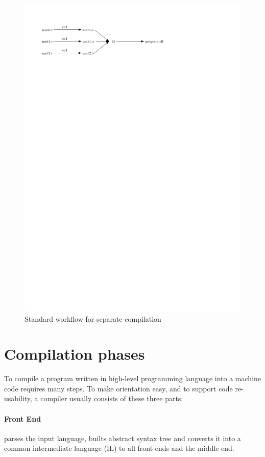 \begin{figure}[h!]
\label{figure-non-lto-workflow}
\centering
\includegraphics{./img/non-lto-workflow.pdf}
\caption{Standard workflow for separate compilation}
\end{figure}


\section{Compilation phases}

To compile a program written in high-level programming language into a machine
code requires many steps. To make orientation easy, and to support code
re-usability, a compiler usually consists of these three parts:

\paragraph{Front End} parses the input language, builts abstract syntax
tree and converts it into a common intermediate language (IL) to all front ends
and the middle end.


